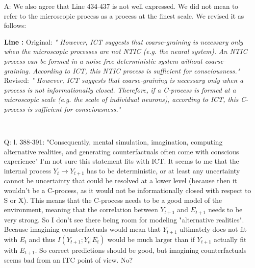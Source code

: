 \documentclass[utf8]{article}
\newcounter{cQuestion}[section]
\newenvironment{question}
    {\refstepcounter{cQuestion}\color{Blue}\noindent\newline Q\thecQuestion:}
    {~\newline}
\newenvironment{ans}  
    {\color{Black}\noindent A:}
    {~\newline}
\newcommand{\revise}[3]{
	\newline
	\newline
    \noindent
    \textbf{Line #1:}
    \newline
    Original:\newline
    \textit{"#2"}
    \newline
    \newline
    Revised:\newline
    \textit{"#3"}\newline}
\begin{document}
\begin{ans}
    		We also agree that Line 434-437 is not well expressed. We did not mean to refer to the microscopic process as a process at the finest scale. We revised it as follows:
    		\revise{}
    		{
    			However, ICT suggests that coarse-graining is necessary only when the microscopic processes are not NTIC (e.g. the neural system). An NTIC process can be formed in a noise-free deterministic system without coarse-graining. According to ICT, this NTIC process is sufficient for consciousness.}
    		{
    			However, ICT suggests that coarse-graining is necessary only when a process is not informationally closed. Therefore, if a C-process is formed at a microscopic scale (e.g. the scale of individual neurons), according to ICT, this C-process is sufficient for consciousness.}
    		
    		
    		
    		
    		
    		
    		
    	\end{ans}
    
    	\begin{question}
    		l. 388-391: "Consequently, mental simulation, imagination, computing alternative realities, and generating counterfactuals often come with conscious experience" I'm not sure this statement fits with ICT. It seems to me that the internal process $Y_t \rightarrow Y_{t+1}$ has to be deterministic, or at least any uncertainty cannot be uncertainty that could be resolved at a lower level (because then it wouldn't be a C-process, as it would not be informationally closed with respect to S or X). This means that the C-process needs to be a good model of the environment, meaning that the correlation between $Y_{t+1}$ and $E_{t+1}$ needs to be very strong. So I don't see there being room for modeling "alternative realities". Because imagining counterfactuals would mean that $Y_{t+1}$ ultimately does not fit with $ E_t $ and thus $ I(Y_{t+1}; Y_t|E_t) $ would be much larger than if $ Y_{t+1} $ actually fit with $ E_{t+1} $. So correct predictions should be good, but imagining counterfactuals seems bad from an ITC point of view. No?
    	\end{question}
    
\end{document}
